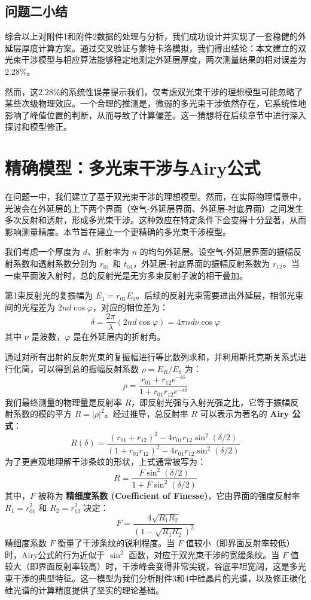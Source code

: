 \documentclass[withoutpreface,bwprint]{cumcmthesis} %
\begin{document}
\subsection{问题二小结}
综合以上对附件1和附件2数据的处理与分析，我们成功设计并实现了一套稳健的外延层厚度计算方案。通过交叉验证与蒙特卡洛模拟，我们得出结论：本文建立的双光束干涉模型与相应算法能够稳定地测定外延层厚度，两次测量结果的相对误差为$2.28\%$。

然而，这$2.28\%$的系统性误差提示我们，仅考虑双光束干涉的理想模型可能忽略了某些次级物理效应。一个合理的推测是，微弱的多光束干涉依然存在，它系统性地影响了峰值位置的判断，从而导致了计算偏差。这一猜想将在后续章节中进行深入探讨和模型修正。

\section{精确模型：多光束干涉与Airy公式}

在问题一中，我们建立了基于双光束干涉的理想模型。然而，在实际物理情景中，光波会在外延层的上下两个界面（空气-外延层界面、外延层-衬底界面）之间发生多次反射和透射，形成多光束干涉。这种效应在特定条件下会变得十分显著，从而影响测量精度。本节旨在建立一个更精确的多光束干涉模型。

我们考虑一个厚度为 $d$、折射率为 $n$ 的均匀外延层。设空气-外延层界面的振幅反射系数和透射系数分别为 $r_{01}$ 和 $t_{01}$，外延层-衬底界面的振幅反射系数为 $r_{12}$。当一束平面波入射时，总的反射光是无穷多束反射子波的相干叠加。

第1束反射光的复振幅为 $E_1 = r_{01}E_0$。后续的反射光束需要进出外延层，相邻光束间的光程差为 $2nd\cos\varphi$，对应的相位差为：
$$
    \delta = \frac{2\pi}{\lambda} (2nd\cos\varphi) = 4\pi n d \nu \cos\varphi
$$
其中 $\nu$ 是波数，$\varphi$ 是在外延层内的折射角。

通过对所有出射的反射光束的复振幅进行等比数列求和，并利用斯托克斯关系式进行化简，可以得到总的振幅反射系数 $\rho = E_R / E_0$ 为：
$$
    \rho = \frac{r_{01} + r_{12} e^{-i\delta}}{1 + r_{01} r_{12} e^{-i\delta}}
$$
我们最终测量的物理量是反射率 $R$，即反射光强与入射光强之比，它等于振幅反射系数的模的平方 $R = |\rho|^2$。经过推导，总反射率 $R$ 可以表示为著名的 \textbf{Airy 公式}：
$$
    R(\delta) = \frac{(r_{01} + r_{12})^2 - 4r_{01}r_{12}\sin^2(\delta/2)}{(1 + r_{01}r_{12})^2 - 4r_{01}r_{12}\sin^2(\delta/2)}
$$
为了更直观地理解干涉条纹的形状，上式通常被写为：
$$
    R = \frac{F \sin^2(\delta/2)}{1 + F \sin^2(\delta/2)}
$$
其中，$F$ 被称为 \textbf{精细度系数 (Coefficient of Finesse)}，它由界面的强度反射率 $R_1 = r_{01}^2$ 和 $R_2 = r_{12}^2$ 决定：
$$
    F = \frac{4\sqrt{R_1 R_2}}{(1-\sqrt{R_1 R_2})^2}
$$
精细度系数 $F$ 衡量了干涉条纹的锐利程度。当 $F$ 值较小（即界面反射率较低）时，Airy公式的行为近似于 $\sin^2$ 函数，对应于双光束干涉的宽缓条纹。当 $F$ 值较大（即界面反射率较高）时，干涉峰会变得非常尖锐，谷底平坦宽阔，这是多光束干涉的典型特征。这一模型为我们分析附件3和4中硅晶片的光谱，以及修正碳化硅光谱的计算精度提供了坚实的理论基础。
\end{document}
